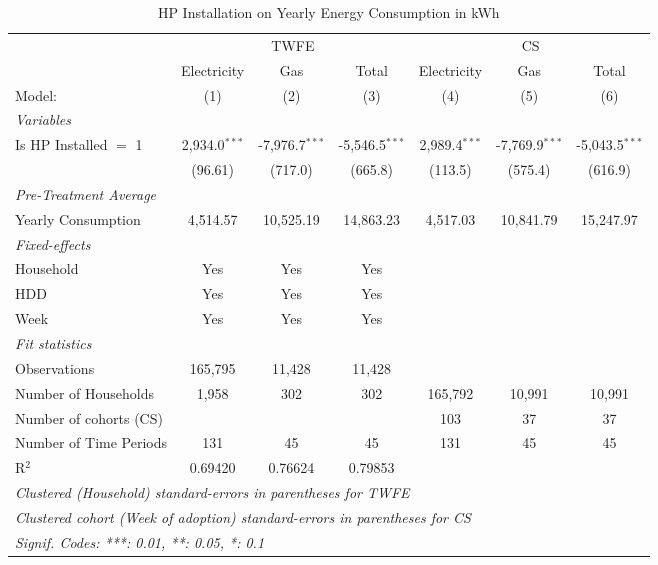 
\begin{table}[htbp]
   \caption{\label{tab:hp-did-overall-conso-detailed} HP Installation on Yearly Energy Consumption in kWh}
   \centering
   \begin{tabular}{lcccccc}
      \tabularnewline \midrule \midrule
       & \multicolumn{3}{c}{TWFE} & \multicolumn{3}{c}{CS} \\ 
                                     & Electricity     & Gas              & Total            & Electricity     & Gas              & Total \\   
      Model:                         & (1)             & (2)              & (3)              & (4)             & (5)              & (6)\\  
      \midrule
      \emph{Variables}\\
      Is HP Installed $=$ 1           &  2,934.0$^{***}$  &  -7,976.7$^{***}$  &  -5,546.5$^{***}$  & 2,989.4$^{***}$ & -7,769.9$^{***}$ & -5,043.5$^{***}$ \\
                                      &  (96.61)          &  (717.0)           &  (665.8)           & (113.5) & (575.4) & (616.9) \\
      \midrule
\emph{Pre-Treatment Average}\\
      Yearly Consumption              &  4,514.57         &  10,525.19         &  14,863.23         & 4,517.03 & 10,841.79 & 15,247.97 \\
\midrule
      \emph{Fixed-effects}\\
      Household                       &  Yes              &  Yes               &  Yes               &  &  &  \\
      HDD                             &  Yes              &  Yes               &  Yes               &  &  &  \\
      Week                            &  Yes              &  Yes               &  Yes               &  &  &  \\
      \midrule
      \emph{Fit statistics}\\
      Observations                    &  165,795          &  11,428            &  11,428            &  &  &  \\
      Number of Households  &  1,958            &  302               &  302               & 165,792 & 10,991 & 10,991 \\
Number of cohorts (CS) & & & & 103 & 37 & 37 \\
      Number of Time Periods          &  131              &  45                &  45                & 131 & 45 & 45 \\
      R$^2$                           &  0.69420          &  0.76624           &  0.79853           &  &  &  \\
      \midrule \midrule
\multicolumn{10}{l}{\emph{Clustered (Household) standard-errors in parentheses for TWFE}}\\
\multicolumn{10}{l}{\emph{Clustered cohort (Week of adoption) standard-errors in parentheses for CS}}\\
      \multicolumn{7}{l}{\emph{Signif. Codes: ***: 0.01, **: 0.05, *: 0.1}}\\
   \end{tabular}
\end{table}


